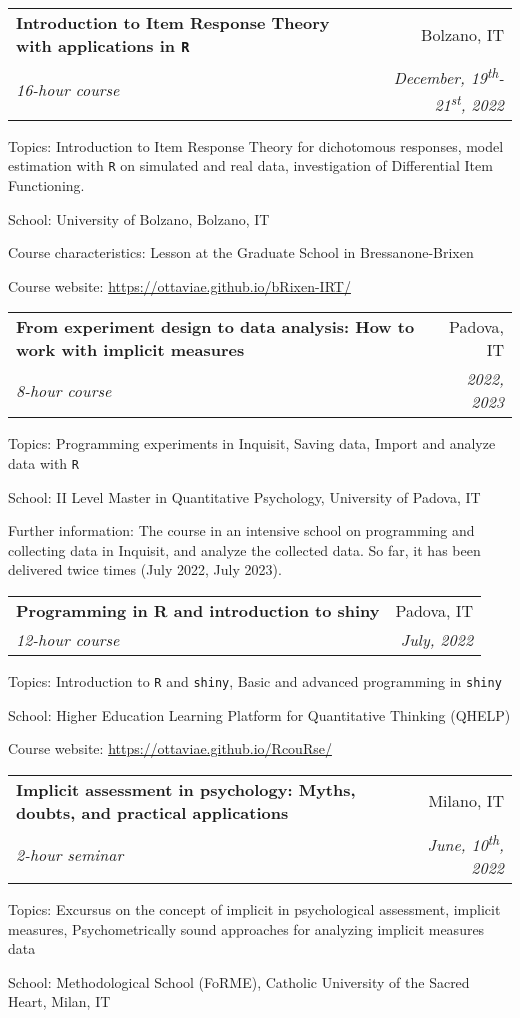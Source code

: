 \documentclass[letterpaper,12pt]{article}
\makeatletter
\newcommand{\resumeSubheading}[4]{
  \vspace{-1pt}\item
    \begin{tabular*}{0.97\textwidth}{l@{\extracolsep{\fill}}r}
      \textbf{#1} & #2 \\
      \textit{\small#3} & \textit{\small #4} \\
    \end{tabular*}\vspace{-5pt}
}
\makeatother
\begin{document}
\resumeSubheading {Introduction to Item Response Theory with applications in \texttt{R}}{Bolzano, IT}{16-hour course}{December, 19\textsuperscript{th}-21\textsuperscript{st}, 2022}

{\small Topics: Introduction to Item Response Theory for dichotomous responses, model estimation with \texttt{R} on simulated and real data, investigation of Differential Item Functioning. }

{\small School: University of Bolzano, Bolzano, IT} 

{\small Course characteristics: Lesson at the Graduate School in Bressanone-Brixen} 

{\small Course website:  \href{https://ottaviae.github.io/bRixen-IRT/}{https://ottaviae.github.io/bRixen-IRT/}} 

\resumeSubheading {From experiment design to data analysis: How to work with implicit measures}{Padova, IT}{8-hour course}{2022, 2023}

{\small Topics: Programming experiments in Inquisit, Saving data, Import and analyze data with \texttt{R}}

{\small School: II Level Master in Quantitative Psychology, University of Padova, IT} 

{\small Further information: The course in an intensive school on programming and collecting data in Inquisit, and analyze the collected data. So far, it has been delivered twice times (July 2022, July 2023). } 



\resumeSubheading {Programming in R and introduction to shiny}{Padova, IT}{12-hour course}{July, 2022}

{\small Topics: Introduction to \texttt{R} and \texttt{shiny}, Basic and advanced programming in \texttt{shiny}} 

{\small School: Higher Education
	Learning Platform for Quantitative Thinking (QHELP)} 
	
{\small Course website: \href{https://ottaviae.github.io/RcouRse/}{https://ottaviae.github.io/RcouRse/}}

\resumeSubheading {Implicit assessment in psychology: Myths, doubts, and practical applications}{Milano, IT}{2-hour seminar}{June, 10\textsuperscript{th}, 2022}

{\small Topics: Excursus on the concept of implicit in psychological assessment, implicit measures, Psychometrically sound approaches for analyzing implicit measures data} 

{\small School: Methodological School (FoRME), Catholic University of the Sacred Heart, Milan, IT} 
\end{document}
